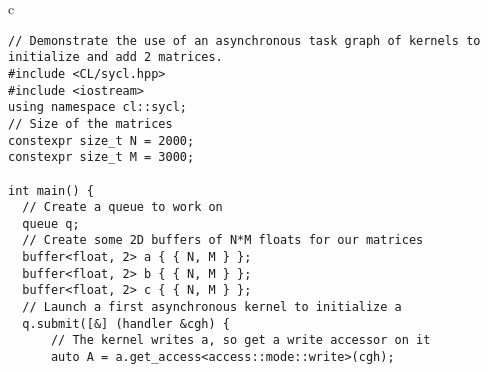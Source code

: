 \documentclass[sigplan, review, authordraft]{acmart}
\begin{document}
\begin{figure*}
  \begin{tabular}{c}
    \begin{lstlisting}[basicstyle=\scriptsize,name=example]
// Demonstrate the use of an asynchronous task graph of kernels to initialize and add 2 matrices.
#include <CL/sycl.hpp>
#include <iostream>
using namespace cl::sycl;
// Size of the matrices
constexpr size_t N = 2000;
constexpr size_t M = 3000;

int main() {
  // Create a queue to work on
  queue q;
  // Create some 2D buffers of N*M floats for our matrices
  buffer<float, 2> a { { N, M } };
  buffer<float, 2> b { { N, M } };
  buffer<float, 2> c { { N, M } };
  // Launch a first asynchronous kernel to initialize a
  q.submit([&] (handler &cgh) {
      // The kernel writes a, so get a write accessor on it
      auto A = a.get_access<access::mode::write>(cgh);


\end{lstlisting}
\end{tabular}
\end{figure*}
\end{document}
